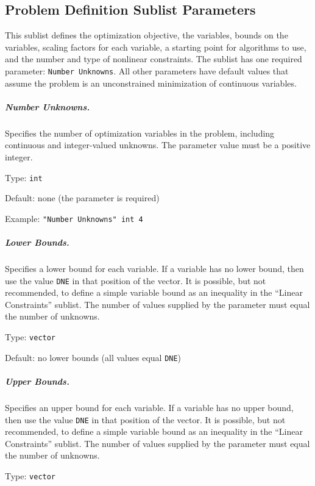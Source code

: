 \clearpage
\subsection{Problem Definition Sublist Parameters}
\label{subconfig:PD}

This sublist defines the optimization objective, the variables, bounds on
the variables, scaling factors for each variable, a starting point for algorithms
to use, and the number and type of nonlinear constraints.
The sublist has one required parameter:  {\tt Number Unknowns}.
All other parameters have default values that assume the problem is an
unconstrained minimization of continuous variables.

\subparagraph{Number Unknowns.}  \label{param:PD-numunks}
Specifies the number of optimization variables in the problem, including
continuous and integer-valued unknowns.
The parameter value must be a positive integer.

\hspace{0.2in}
Type: {\tt int}

\hspace{0.2in}
Default: none (the parameter is required)

\hspace{0.2in}
Example: {\tt "Number Unknowns" int 4}

\subparagraph{Lower Bounds.}  \label{param:PD-lbnd}
Specifies a lower bound for each variable.  If a variable has
no lower bound, then use the value {\tt DNE} in that position of the vector.
It is possible, but not recommended, to define a simple variable bound as an
inequality in the ``Linear Constraints'' sublist.
The number of values supplied by the parameter must equal the number of unknowns.

\hspace{0.2in}
Type: {\tt vector}

\hspace{0.2in}
Default: no lower bounds (all values equal {\tt DNE})

\subparagraph{Upper Bounds.}  \label{param:PD-ubnd}
Specifies an upper bound for each variable.  If a variable has
no upper bound, then use the value {\tt DNE} in that position of the vector.
It is possible, but not recommended, to define a simple variable bound as an
inequality in the ``Linear Constraints'' sublist.
The number of values supplied by the parameter must equal the number of unknowns.

\hspace{0.2in}
Type: {\tt vector}

